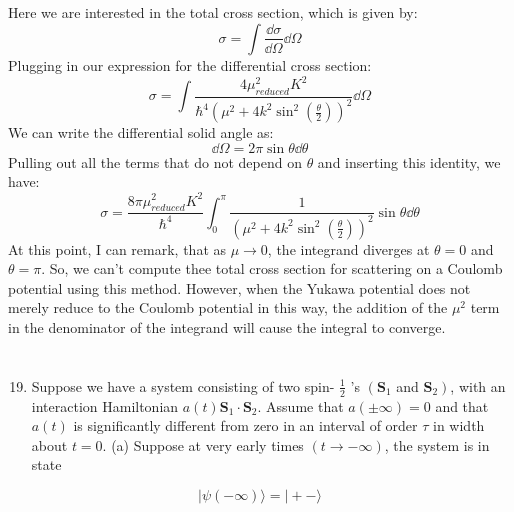 \documentclass[12pt]{article}
\begin{document}
\subsection{}
Here we are interested in the total cross section, which is given by:
\begin{equation}
  \sigma = \int \frac{\dd{\sigma}}{\dd{\Omega}}\dd{\Omega}
\end{equation}
Plugging in our expression for the differential cross section:
\begin{equation}
  \sigma = \int \frac{4\mu^2_{reduced}K^2}{\hbar^4(\mu^2 + 4k^2\sin^2\left(\frac{\theta}{2}\right))^2}\dd{\Omega}
\end{equation}
We can write the differential solid angle as:
\begin{equation}
  \dd{\Omega} = 2\pi \sin\theta \dd{\theta}
\end{equation}
Pulling out all the terms that do not depend on $\theta$ and inserting this identity, we have:
\begin{equation}
  \sigma = \frac{8\pi\mu^2_{reduced}K^2}{\hbar^4}\int_0^{\pi} \frac{1}{(\mu^2 + 4k^2\sin^2\left(\frac{\theta}{2}\right))^2}\sin\theta \dd{\theta}
\end{equation}
At this point, I can remark, that as $\mu \rightarrow 0$, the integrand diverges at $\theta = 0$ and $\theta = \pi$. So, we can't compute thee total cross section for scattering on a Coulomb potential using this method. However, when the Yukawa potential does not merely reduce to the Coulomb potential in this way, the addition of the $\mu^2$ term in the denominator of the integrand will cause the integral to converge.\\
\section{}
\begin{enumerate}
  \setcounter{enumi}{18}
  \item Suppose we have a system consisting of two spin- $\frac{1}{2}$ 's $\left(\mathbf{S}_{1}\right.$ and $\left.\mathbf{S}_{2}\right)$, with an interaction Hamiltonian $a(t) \mathbf{S}_{1} \cdot \mathbf{S}_{2}$. Assume that $a( \pm \infty)=0$ and that $a(t)$ is significantly different from zero in an interval of order $\tau$ in width about $t=0$.
(a) Suppose at very early times $(t \rightarrow-\infty)$, the system is in state
\end{enumerate}

$$
|\psi(-\infty)\rangle=|+-\rangle
$$
\end{document}
